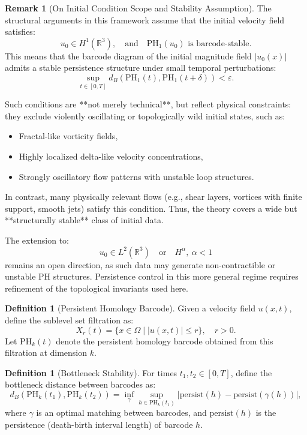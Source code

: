 \documentclass[11pt]{article}
\theoremstyle{definition}
\newtheorem{definition}[theorem]{Definition}
\newtheorem{remark}[theorem]{Remark}
\begin{document}
\begin{remark}[On Initial Condition Scope and Stability Assumption]
The structural arguments in this framework assume that the initial velocity field satisfies:
\[
u_0 \in H^1(\mathbb{R}^3), \quad \text{and} \quad \mathrm{PH}_1(u_0) \text{ is barcode-stable}.
\]
This means that the barcode diagram of the initial magnitude field $|u_0(x)|$ admits a stable persistence structure under small temporal perturbations:
\[
\sup_{t \in [0,T]} d_B(\mathrm{PH}_1(t), \mathrm{PH}_1(t+\delta)) < \varepsilon.
\]

Such conditions are **not merely technical**, but reflect physical constraints:  
they exclude violently oscillating or topologically wild initial states, such as:
\begin{itemize}
  \item Fractal-like vorticity fields,
  \item Highly localized delta-like velocity concentrations,
  \item Strongly oscillatory flow patterns with unstable loop structures.
\end{itemize}

In contrast, many physically relevant flows (e.g., shear layers, vortices with finite support, smooth jets) satisfy this condition.  
Thus, the theory covers a wide but **structurally stable** class of initial data.

The extension to:
\[
u_0 \in L^2(\mathbb{R}^3) \quad \text{or} \quad H^\alpha, \ \alpha < 1
\]
remains an open direction, as such data may generate non-contractible or unstable PH structures.  
Persistence control in this more general regime requires refinement of the topological invariants used here.
\end{remark}

\begin{definition}[Persistent Homology Barcode] \label{def:sublevel-filtration}
Given a velocity field $u(x,t)$, define the sublevel set filtration as:
\[
X_r(t) = \{x \in \Omega \mid |u(x,t)| \leq r \}, \quad r > 0.
\]
Let $\mathrm{PH}_k(t)$ denote the persistent homology barcode obtained from this filtration at dimension $k$.
\end{definition}

\begin{definition}[Bottleneck Stability]
For times $t_1, t_2 \in [0,T]$, define the bottleneck distance between barcodes as:
\[
d_B(\mathrm{PH}_k(t_1), \mathrm{PH}_k(t_2)) = \inf_{\gamma} \sup_{h \in \mathrm{PH}_k(t_1)}|\mathrm{persist}(h)-\mathrm{persist}(\gamma(h))|,
\]
where $\gamma$ is an optimal matching between barcodes, and $\mathrm{persist}(h)$ is the persistence (death-birth interval length) of barcode $h$.
\end{definition}
\end{document}
